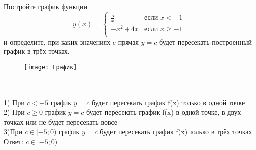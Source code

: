 \documentclass{article}
\begin{document}
	Постройте график функции\\
	\begin{equation*}
	y(x) = 
	\begin{cases}
	\frac{5}{x} &\text{если $x < -1$}\\
	-x^2+4x &\text{если $x \ge -1$}\\
	\end{cases}
	\end{equation*}
	и определите, при каких значениях c  прямая {$y=c$}   будет пересекать построенный график в трёх точках.\\
	\graphicspath{{Pictures/}}
	\begin{figure}[hb]
		\begin{center}
			\texttt{[image: График]}
		\end{center}
	\end{figure}
	\\
	\\
	1) При {$c<-5$} график  {$y=c$} будет пересекать график f(x) только в одной точке\\
	2) При {$c \geq 0$}  график  {$y=c$} будет пересекать график f(x) в одной точке, в двух точках или не будет пересекать вовсе\\
	3)При {$c \in [-5;0)$} график  {$y=c$} будет пересекать график f(x) только в трёх точках\\
	Ответ: {$c \in [-5;0)$}
\end{document}
